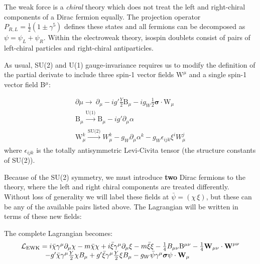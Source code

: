 The weak force is a \textit{chiral} theory which does not treat the left and right-chiral components of a Dirac fermion equally.  The projection operator $P_{R,L} = \frac{1}{2} ( 1 \pm \gamma^{5})$ defines these states and all fermions can be decomposed as $\psi = \psi_{L} + \psi_{R}$. Within the electroweak theory, isospin doublets consist of pairs of left-chiral particles and right-chiral antiparticles.

As usual, SU(2) and U(1) gauge-invariance requires us to modify the definition of the partial derivate to include three spin-1 vector fields $\bm{\mathrm{W}}^{\mu}$ and a single spin-1 vector field B$^{\mu}$:

\begin{equation}
\begin{array}{l}
\partial{\mu} \rightarrow\ \partial_{\mu} - i g' \frac{Y}{2}\mathrm{B}_{\mu} -  i g_{W} \frac{1}{2}\bm{\sigma} \cdot \bm{\mathrm{W}}_{\mu}\\
\mathrm{B}_{\mu} \xrightarrow[]{\text{U(1)}} \mathrm{B}_{\mu} - i g' \partial_{\mu} \alpha \\
\mathrm{W}^{k}_{\mu} \xrightarrow[]{\text{SU(2)}} W^{k}_{\mu} - g_{W} \partial_{\mu} \alpha^{k} -  g_{W} \epsilon_{ijk} \xi^{i} W^{j}_{\mu}
 \end{array}
\end{equation}
where $\epsilon_{ijk}$ is the totally antisymmetric Levi-Civita tensor (the structure constants of SU(2)).

Because of the SU(2) symmetry, we must introduce \textbf{two} Dirac fermions to the theory, where the left and right chiral components are treated differently. Without loss of generality we will label these fields at $\bar{\psi} = (\chi \, \xi)$, but these can be any of the available pairs listed above. The Lagrangian will be written in terms of these new fields:

The complete Lagrangian becomes:
\begin{equation}
\begin{array}{l}
\mathcal{L}_{\mathrm{EWK}} = 
i \bar{\chi} \gamma^{\mu} \partial_{\mu} \chi - m \bar{\chi} \chi
+ i \bar{\xi}   \gamma^{\mu}    \partial_{\mu} \xi  - m \bar{\xi} \xi
- \frac{1}{4}\mathrm{}B_{\mu\nu}\mathrm{B}^{\mu\nu}
-\frac{1}{4}\bm{\mathrm{W}}_{\mu\nu} \cdot \bm{\mathrm{W}}^{\mu\nu} \\
\hspace{1.2cm}
-  g' \bar{\chi} \gamma^{\mu} \frac{Y}{2} \chi B_{\mu} + g' \bar{\xi} \gamma^{\mu} \frac{Y}{2} \xi B_{\mu}
- g_W  \bar{\psi} \gamma^{\mu} \bm{\sigma} \psi \cdot \bm{\mathrm{W}}_{\mu}
\end{array}
\end{equation}

